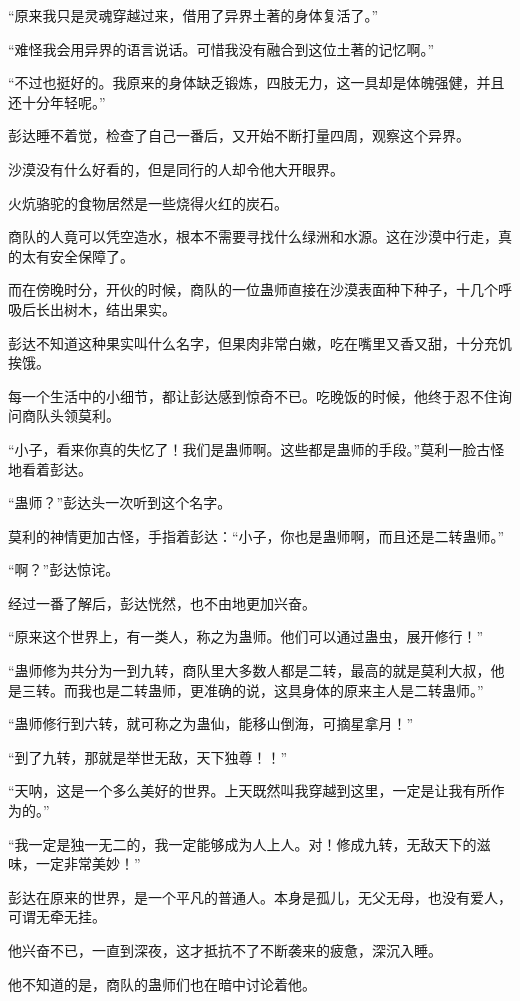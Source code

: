 \begin{this_body}
“原来我只是灵魂穿越过来，借用了异界土著的身体复活了。”

“难怪我会用异界的语言说话。可惜我没有融合到这位土著的记忆啊。”

“不过也挺好的。我原来的身体缺乏锻炼，四肢无力，这一具却是体魄强健，并且还十分年轻呢。”

彭达睡不着觉，检查了自己一番后，又开始不断打量四周，观察这个异界。

沙漠没有什么好看的，但是同行的人却令他大开眼界。

火炕骆驼的食物居然是一些烧得火红的炭石。

商队的人竟可以凭空造水，根本不需要寻找什么绿洲和水源。这在沙漠中行走，真的太有安全保障了。

而在傍晚时分，开伙的时候，商队的一位蛊师直接在沙漠表面种下种子，十几个呼吸后长出树木，结出果实。

彭达不知道这种果实叫什么名字，但果肉非常白嫩，吃在嘴里又香又甜，十分充饥挨饿。

每一个生活中的小细节，都让彭达感到惊奇不已。吃晚饭的时候，他终于忍不住询问商队头领莫利。

“小子，看来你真的失忆了！我们是蛊师啊。这些都是蛊师的手段。”莫利一脸古怪地看着彭达。

“蛊师？”彭达头一次听到这个名字。

莫利的神情更加古怪，手指着彭达：“小子，你也是蛊师啊，而且还是二转蛊师。”

“啊？”彭达惊诧。

经过一番了解后，彭达恍然，也不由地更加兴奋。

“原来这个世界上，有一类人，称之为蛊师。他们可以通过蛊虫，展开修行！”

“蛊师修为共分为一到九转，商队里大多数人都是二转，最高的就是莫利大叔，他是三转。而我也是二转蛊师，更准确的说，这具身体的原来主人是二转蛊师。”

“蛊师修行到六转，就可称之为蛊仙，能移山倒海，可摘星拿月！”

“到了九转，那就是举世无敌，天下独尊！！”

“天呐，这是一个多么美好的世界。上天既然叫我穿越到这里，一定是让我有所作为的。”

“我一定是独一无二的，我一定能够成为人上人。对！修成九转，无敌天下的滋味，一定非常美妙！”

彭达在原来的世界，是一个平凡的普通人。本身是孤儿，无父无母，也没有爱人，可谓无牵无挂。

他兴奋不已，一直到深夜，这才抵抗不了不断袭来的疲惫，深沉入睡。

他不知道的是，商队的蛊师们也在暗中讨论着他。


\end{this_body}
